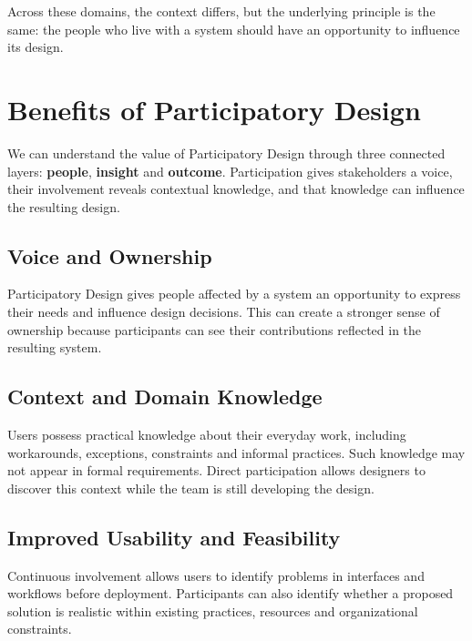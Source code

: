 \documentclass[a4paper,12pt]{article}
\begin{document}
Across these domains, the context differs, but the underlying principle is
the same: the people who live with a system should have an opportunity to
influence its design.



\section{Benefits of Participatory Design}
\label{sec:benefits}

We can understand the value of Participatory Design through three connected
layers: \textbf{people}, \textbf{insight} and \textbf{outcome}. Participation
gives stakeholders a voice, their involvement reveals contextual knowledge,
and that knowledge can influence the resulting design.


\subsection{Voice and Ownership}

Participatory Design gives people affected by a system an opportunity to
express their needs and influence design decisions. This can create a
stronger sense of ownership because participants can see their contributions
reflected in the resulting system.


\subsection{Context and Domain Knowledge}

Users possess practical knowledge about their everyday work, including
workarounds, exceptions, constraints and informal practices. Such knowledge
may not appear in formal requirements. Direct participation allows designers
to discover this context while the team is still developing the design.


\subsection{Improved Usability and Feasibility}

Continuous involvement allows users to identify problems in interfaces and
workflows before deployment. Participants can also identify whether a
proposed solution is realistic within existing practices, resources and
organizational constraints.
\end{document}
